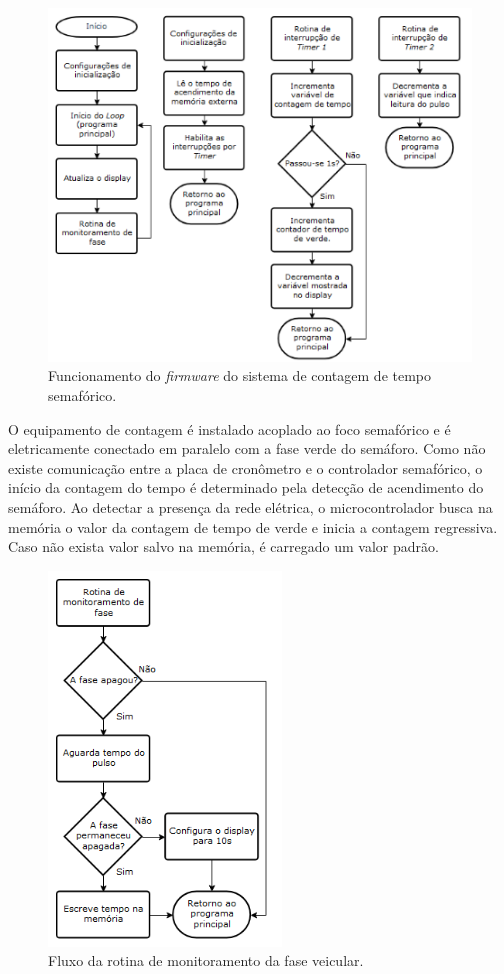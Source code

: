 \begin{figure}[ht]
    \begin{center}
    \includegraphics{figuras/fluxo_cron.PNG}
    \end{center}
    \caption[Fluxograma do sistema de cronômetro]{Funcionamento do \textit{firmware} do sistema de contagem de tempo semafórico.}
    \label{fluxo_cron}
\end{figure}

O equipamento de contagem é instalado acoplado ao foco semafórico e é eletricamente conectado em paralelo com a fase verde do semáforo. Como não existe comunicação entre a placa de cronômetro e o controlador semafórico, o início da contagem do tempo é determinado pela detecção de acendimento do semáforo. Ao detectar a presença da rede elétrica, o microcontrolador busca na memória o valor da contagem de tempo de verde e inicia a contagem regressiva. Caso não exista valor salvo na memória, é carregado um valor padrão.

\begin{figure}[ht]
    \begin{center}
    \includegraphics{figuras/fluxo_cron2.PNG}
    \end{center}
    \caption[Fluxograma do monitoramento do cronômetro]{Fluxo da rotina de monitoramento da fase veicular.}
    \label{fluxo_cron2}
\end{figure}

